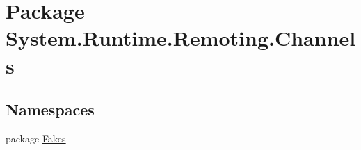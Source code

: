 \hypertarget{namespace_system_1_1_runtime_1_1_remoting_1_1_channels}{\section{Package System.\-Runtime.\-Remoting.\-Channels}
\label{namespace_system_1_1_runtime_1_1_remoting_1_1_channels}
}
\subsection*{Namespaces}
\begin{DoxyCompactItemize}
\item 
package \hyperlink{namespace_system_1_1_runtime_1_1_remoting_1_1_channels_1_1_fakes}{Fakes}
\end{DoxyCompactItemize}
